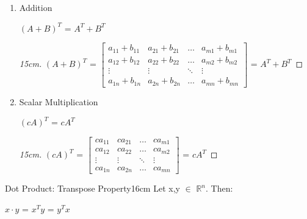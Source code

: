     \begin{enumerate}[label=(\alph*), leftmargin=2cm, itemsep=0.1cm]
        \item {\color{lgreen} Addition}
        
            \hspace{0.5cm}
            $(A+B)^T$ = $A^T + B^T$

            \begin{proof}[15cm]
                $(A+B)^T$ =
                \footnotesize
                $\begin{bmatrix}
                    a_{11}+b_{11} & a_{21}+b_{21} & \hdots & a_{m1}+b_{m1} \\
                    a_{12}+b_{12} & a_{22}+b_{22} & \hdots & a_{m2}+b_{m2} \\
                    \vdots & \vdots & \ddots & \vdots \\
                    a_{1n}+b_{1n} & a_{2n}+b_{2n} & \hdots & a_{mn}+b_{mn} 
                \end{bmatrix}$
                \normalsize
                = $A^T + B^T$
            \end{proof}
        
        \item {\color{lgreen} Scalar Multiplication}
        
            \hspace{0.5cm}
            $(cA)^T$ = $cA^T$

            \begin{proof}[15cm]
                $(cA)^T$ =
                \footnotesize
                $\begin{bmatrix}
                    ca_{11} & ca_{21} & \hdots & ca_{m1} \\
                    ca_{12} & ca_{22} & \hdots & ca_{m2} \\
                    \vdots & \vdots & \ddots & \vdots \\
                    ca_{1n} & ca_{2n} & \hdots & ca_{mn} 
                \end{bmatrix}$
                \normalsize
                = $cA^T$
            \end{proof}
    \end{enumerate}

    \vspace{0.5cm}



    \begin{wtheorem}{Dot Product: Transpose Property}{16cm}
        Let x,y $\in$ $\mathbb{R}^n$. Then:

        \hspace{0.5cm}
        $x \cdot y$ = $x^T y$ = $y^T x$
    \end{wtheorem}

